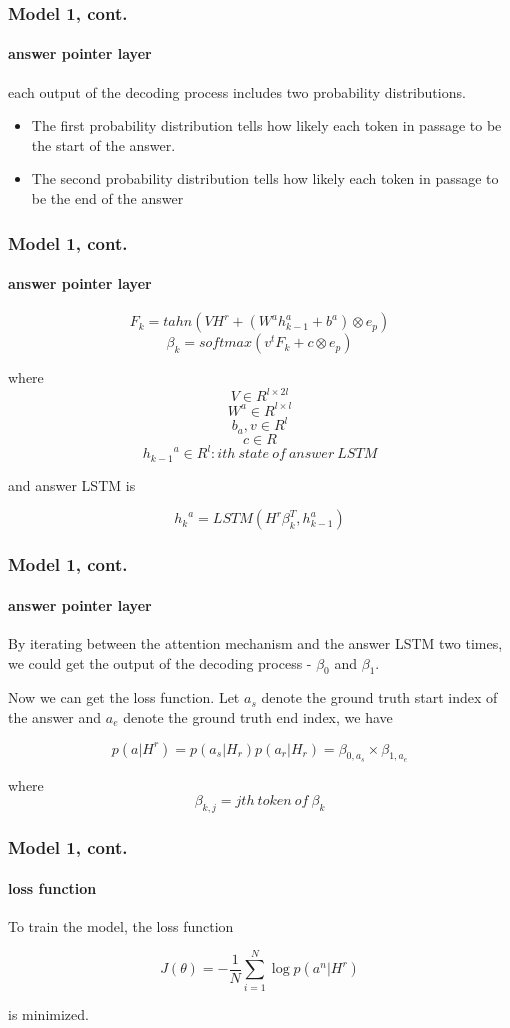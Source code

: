\documentclass{beamer}
\begin{document}
\begin{frame} \frametitle{Model 1, cont.}\framesubtitle{answer pointer layer}
each output of the decoding process includes two probability distributions.
   \begin{itemize}
       \item The first probability distribution tells how likely each token in passage to be the start of the answer.
       \item The second probability distribution tells how likely each token in passage to be the end of the answer
   \end{itemize}
\end{frame}

\begin{frame}\frametitle{Model 1, cont.}\framesubtitle{answer pointer layer}
    $$F_k = tahn(VH^r + (W^a{h^a_{k-1}} +  b^a) \otimes e_p)$$
    $$\beta _k = softmax(v^tF_k + c \otimes e_p)$$


    where
    $$V \in R^{l \times 2l}$$
    $$W^a\in R^{l \times l} $$
    $$b_a, v\in R^{l}  $$
    $$c \in R $$
    $${h_{k-1}}^a\in R^{l}: ith\ state\ of\ answer\ LSTM  $$

    and answer LSTM is


    $${h_k}^a = LSTM(H^r\beta _k^T, h_{k-1}^a)$$
\end{frame}

\begin{frame}\frametitle{Model 1, cont.}\framesubtitle{answer pointer layer}
    By iterating between the attention mechanism and the answer LSTM two times, we could get the output of the decoding process - $\beta _0$ and $\beta _1$.


    Now we can get the loss function. Let $a_s$ denote the ground truth start index of the answer and $a_e$ denote the ground truth end index, we have

    $$p(a|H^r) = p(a_s|H_r)p(a_r|H_r)=\beta _{0, a_s} \times \beta_{1, a_e}$$

    where $$\beta_{k, j} = jth\ token\ of\ \beta _k$$

\end{frame}

\begin{frame}\frametitle{Model 1, cont.}\framesubtitle{loss function}
    To train the model, the loss function

    $$J(\theta) = -\frac{1}{N}\sum_{i=1}^{N} \log{p(a^n|H^r)} $$

    is minimized.
\end{frame}
\end{document}
